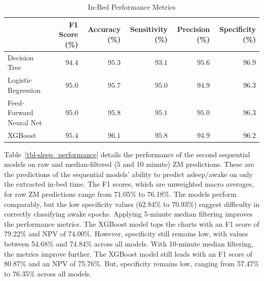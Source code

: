 \documentclass[
  super,
  preprint,
  3p]{elsarticle}
\begin{document}
\hypertarget{tbl-in_bed_performance}{}
\begin{longtable}{lrrrrr}
\caption{\label{tbl-in_bed_performance}In-Bed Performance Metrics }\tabularnewline

\toprule
 & F1 Score (\%) & Accuracy (\%) & Sensitivity (\%) & Precision (\%) & Specificity (\%) \\ 
\midrule
Decision Tree & $94.4$ & $95.3$ & $93.1$ & $95.6$ & $96.9$ \\ 
Logistic Regression & $95.0$ & $95.7$ & $95.0$ & $94.9$ & $96.3$ \\ 
Feed-Forward Neural Net & $95.0$ & $95.8$ & $95.1$ & $95.0$ & $96.3$ \\ 
XGBoost & $95.4$ & $96.1$ & $95.8$ & $94.9$ & $96.2$ \\ 
\bottomrule
\end{longtable}

Table~\ref{tbl-sleep_performance} details the performance of the second
sequential models on raw and median-filtered (5 and 10 minute) ZM
predictions. These are the predictions of the sequential models' ability
to predict asleep/awake on only the extracted in-bed time. The F1
scores, which are unweighted macro averages, for raw ZM predictions
range from 71.05\% to 76.18\%. The models perform comparably, but the
low specificity values (62.84\% to 70.93\%) suggest difficulty in
correctly classifying awake epochs. Applying 5-minute median filtering
improves the performance metrics. The XGBoost model tops the charts with
an F1 score of 79.22\% and NPV of 74.00\%. However, specificity still
remains low, with values between 54.68\% and 74.84\% across all models.
With 10-minute median filtering, the metrics improve further. The
XGBoost model still leads with an F1 score of 80.87\% and an NPV of
75.76\%. But, specificity remains low, ranging from 57.47\% to 76.35\%
across all models.
\end{document}
